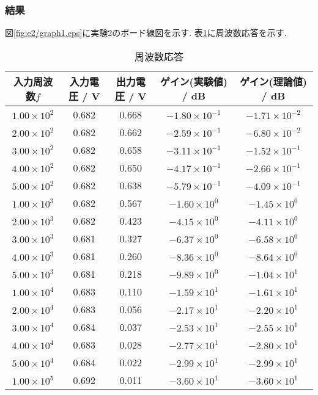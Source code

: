 \subsubsection{結果}
図\ref{fig:e2/graph1.eps}に実験2のボード線図を示す.
表\ref{tab:e2_outou}に周波数応答を示す.
\begin{table}[h]
  \caption{周波数応答}
  \label{tab:e2_outou}
  \centering
  \begin{tabular}{ccccc}
    \hline
    入力周波数$f$&入力電圧 / \si{\volt}&出力電圧 / \si{\volt}&ゲイン(実験値) / \si{\deci\bel}&ゲイン(理論値) / \si{\deci\bel}\\
    \hline \hline
    $1.00\times10^2$ & 0.682 & 0.668 & $-1.80\times10^{-1}$ & $-1.71\times10^{-2}$ \\
    $2.00\times10^2$ & 0.682 & 0.662 & $-2.59\times10^{-1}$ & $-6.80\times10^{-2}$ \\
    $3.00\times10^2$ & 0.682 & 0.658 & $-3.11\times10^{-1}$ & $-1.52\times10^{-1}$ \\
    $4.00\times10^2$ & 0.682 & 0.650 & $-4.17\times10^{-1}$ & $-2.66\times10^{-1}$ \\
    $5.00\times10^2$ & 0.682 & 0.638 & $-5.79\times10^{-1}$ & $-4.09\times10^{-1}$ \\
    $1.00\times10^3$ & 0.682 & 0.567 & $-1.60\times10^{0}$ & $-1.45\times10^{0}$ \\
    $2.00\times10^3$ & 0.682 & 0.423 & $-4.15\times10^{0}$ & $-4.11\times10^{0}$ \\
    $3.00\times10^3$ & 0.681 & 0.327 & $-6.37\times10^{0}$ & $-6.58\times10^{0}$ \\
    $4.00\times10^3$ & 0.681 & 0.260 & $-8.36\times10^{0}$ & $-8.64\times10^{0}$ \\
    $5.00\times10^3$ & 0.681 & 0.218 & $-9.89\times10^{0}$ & $-1.04\times10^{1}$ \\
    $1.00\times10^4$ & 0.683 & 0.110 & $-1.59\times10^{1}$ & $-1.61\times10^{1}$ \\
    $2.00\times10^4$ & 0.683 & 0.056 & $-2.17\times10^{1}$ & $-2.20\times10^{1}$ \\
    $3.00\times10^4$ & 0.684 & 0.037 & $-2.53\times10^{1}$ & $-2.55\times10^{1}$ \\
    $4.00\times10^4$ & 0.683 & 0.028 & $-2.77\times10^{1}$ & $-2.80\times10^{1}$ \\
    $5.00\times10^4$ & 0.684 & 0.022 & $-2.99\times10^{1}$ & $-2.99\times10^{1}$ \\
    $1.00\times10^5$ & 0.692 & 0.011 & $-3.60\times10^{1}$ & $-3.60\times10^{1}$ \\
    \hline
  \end{tabular}
\end{table}
